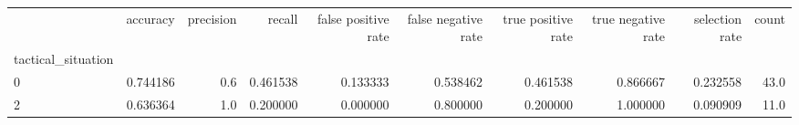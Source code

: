\begin{tabular}{lrrrrrrrrr}
\toprule
{} &  accuracy &  precision &    recall &  false positive rate &  false negative rate &  true positive rate &  true negative rate &  selection rate &  count \\
tactical\_situation &           &            &           &                      &                      &                     &                     &                 &        \\
\midrule
0                  &  0.744186 &        0.6 &  0.461538 &             0.133333 &             0.538462 &            0.461538 &            0.866667 &        0.232558 &   43.0 \\
2                  &  0.636364 &        1.0 &  0.200000 &             0.000000 &             0.800000 &            0.200000 &            1.000000 &        0.090909 &   11.0 \\
\bottomrule
\end{tabular}
